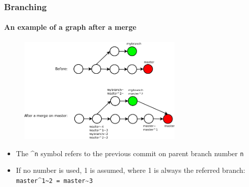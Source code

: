 \begin{frame}
\frametitle{Branching}
\framesubtitle{An example of a graph after a merge}

\begin{figure}
\includegraphics[width=0.7\textwidth]{lecture03/img/merging.png}
\end{figure}

\begin{itemize}
\item The \textasciicircum{}\texttt{n} symbol refers to the previous commit on parent branch number \texttt{n}
\item If no number is used, 1 is assumed, where 1 is always the referred branch: \texttt{master}\textasciicircum{}\texttt{1\textasciitilde{}2 = master}\textasciitilde{}\texttt{3}
\end{itemize}

\end{frame}

